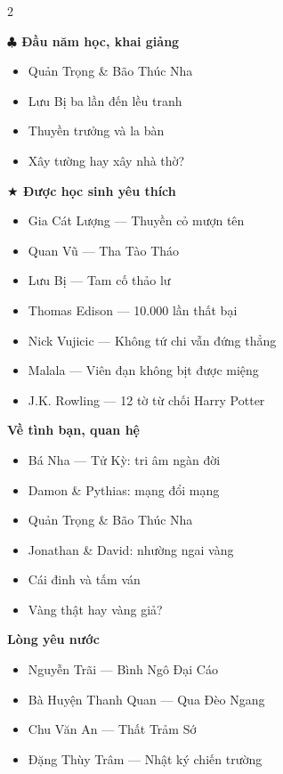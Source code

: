 \begin{multicols}{2}
\vspace{0.4cm}

\textbf{\color{truyengold}$\clubsuit$ Đầu năm học, khai giảng}
\begin{itemize}[noitemsep, leftmargin=1.2cm]
  \item Quản Trọng \& Bão Thúc Nha
  \item Lưu Bị ba lần đến lều tranh
  \item Thuyền trưởng và la bàn
  \item Xây tường hay xây nhà thờ?
\end{itemize}

\columnbreak

\textbf{\color{truyenred}$\bigstar$ Được học sinh yêu thích}
\begin{itemize}[noitemsep, leftmargin=1.2cm]
  \item Gia Cát Lượng --- Thuyền cỏ mượn tên
  \item Quan Vũ --- Tha Tào Tháo
  \item Lưu Bị --- Tam cố thảo lư
  \item Thomas Edison --- 10.000 lần thất bại
  \item Nick Vujicic --- Không tứ chi vẫn đứng thẳng
  \item Malala --- Viên đạn không bịt được miệng
  \item J.K. Rowling --- 12 tờ từ chối Harry Potter
\end{itemize}

\vspace{0.4cm}

\textbf{\color{truyengreen}Về tình bạn, quan hệ}
\begin{itemize}[noitemsep, leftmargin=1.2cm]
  \item Bá Nha --- Tử Kỳ: tri âm ngàn đời
  \item Damon \& Pythias: mạng đổi mạng
  \item Quản Trọng \& Bão Thúc Nha
  \item Jonathan \& David: nhường ngai vàng
  \item Cái đinh và tấm ván
  \item Vàng thật hay vàng giả?
\end{itemize}

\vspace{0.4cm}

\textbf{\color{truyenred}Lòng yêu nước}
\begin{itemize}[noitemsep, leftmargin=1.2cm]
  \item Nguyễn Trãi --- Bình Ngô Đại Cáo
  \item Bà Huyện Thanh Quan --- Qua Đèo Ngang
  \item Chu Văn An --- Thất Trảm Sớ
  \item Đặng Thùy Trâm --- Nhật ký chiến trường
\end{itemize}


\end{multicols}
